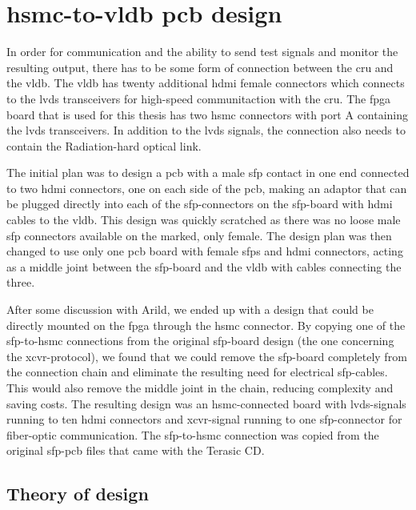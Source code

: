 \documentclass[main.tex]{subfiles}
\begin{document}
\chapter{\acrshort{hsmc}-to-\acrshort{vldb} \acrshort{pcb} design}

In order for communication and the ability to send test signals and monitor the resulting output, there has to be some form of connection between the \gls{cru} and the \gls{vldb}. The \gls{vldb} has twenty additional \gls{hdmi} female connectors which connects to the \gls{lvds} transceivers for high-speed communitaction with the \gls{cru}. The \gls{fpga} board that is used for this thesis has two \gls{hsmc} connectors with port A containing the \gls{lvds} transceivers. In addition to the \gls{lvds} signals, the connection also needs to contain the Radiation-hard optical link.

The initial plan was to design a \gls{pcb} with a male \gls{sfp} contact in one end connected to two \gls{hdmi} connectors, one on each side of the \gls{pcb}, making an adaptor that can be plugged directly into each of the \gls{sfp}-connectors on the \gls{sfp}-board with \gls{hdmi} cables to the \gls{vldb}. This design was quickly scratched as there was no loose male \gls{sfp} connectors available on the marked, only female. The design plan was then changed to use only one \gls{pcb} board with female \gls{sfp}s and \gls{hdmi} connectors, acting as a middle joint between the \gls{sfp}-board and the \gls{vldb} with cables connecting the three. 

After some discussion with Arild, we ended up with a design that could be directly mounted on the \gls{fpga} through the \gls{hsmc} connector. By copying one of the \gls{sfp}-to-\gls{hsmc} connections from the original \gls{sfp}-board design (the one concerning the \gls{xcvr}-protocol), we found that we could remove the \gls{sfp}-board completely from the connection chain and eliminate the resulting need for electrical \gls{sfp}-cables. This would also remove the middle joint in the chain, reducing complexity and saving costs. The resulting design was an \gls{hsmc}-connected board with \gls{lvds}-signals running to ten \gls{hdmi} connectors and \gls{xcvr}-signal running to one \gls{sfp}-connector for fiber-optic communication. The \gls{sfp}-to-\gls{hsmc} connection was copied from the original \gls{sfp}-\gls{pcb} files that came with the Terasic CD.


\section{Theory of design}
\end{document}
